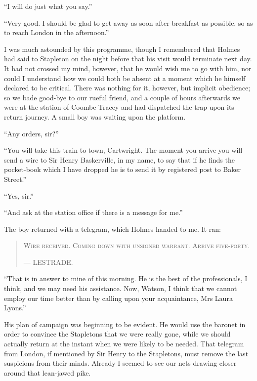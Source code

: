 \documentclass[paper=5.5in:8.5in,BCOR=7mm,twoside,DIV=calc,12pt,usegeometry,openany,chapterprefix,endperiod]{scrbook} %
\begin{document}
\enquote{I will do just what you say.}

\enquote{Very good. I should be glad to get away as soon after breakfast as possible, so as to reach London in the afternoon.}

I was much astounded by this programme, though I re\-mem\-bered that Holmes had said to Stapleton on the night before that his visit would terminate next day. It had not crossed my mind, however, that he would wish me to go with him, nor could I understand how we could both be absent at a moment which he himself declared to be critical. There was nothing for it, however, but implicit obedience; so we bade good-bye to our rueful friend, and a couple of hours afterwards we were at the station of Coombe Tracey and had dispatched the trap upon its return journey. A small boy was waiting upon the platform.

\enquote{Any orders, sir?}

\enquote{You will take this train to town, Cartwright. The moment you arrive you will send a wire to Sir Henry Baskerville, in my name, to say that if he finds the pocket-book which I have dropped he is to send it by registered post to Baker Street.}

\enquote{Yes, sir.}

\enquote{And ask at the station office if there is a message for me.}

The boy returned with a telegram, which Holmes handed to me. It ran: 
\begin{samepage}
\blockquote{
\textsc{Wire received. Coming down with unsigned warrant. Arrive five-forty.}
\begin{flushright}
\nobreakdash---  {\small\scshape LESTRADE.}
\end{flushright}
}
\end{samepage}

\enquote{That is in answer to mine of this morning. He is the best of the professionals, I think, and we may need his assistance. Now, Watson, I think that we cannot employ our time better than by calling upon your acquaintance, Mrs Laura Lyons.}

His plan of campaign was beginning to be evident. He would use the baronet in order to convince the Stapletons that we were really gone, while we should actually return at the instant when we were likely to be needed. That telegram from London, if mentioned by Sir Henry to the Stapletons, must remove the last suspicions from their minds. Already I seemed to see our nets drawing closer around that lean-jawed pike.
\end{document}
